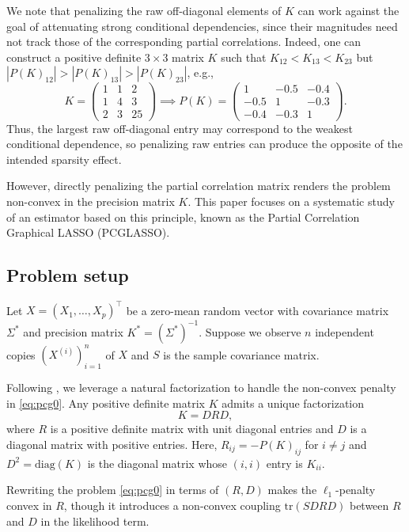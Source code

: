 \documentclass[12pt]{amsart}
\numberwithin{equation}{section}
\numberwithin{equation}{section}
\theoremstyle{plain}
\theoremstyle{definition}
\newcommand{\tr}{\mathrm{tr}}
\newcommand{\diag}[1]{\mathrm{diag}(#1)}
\begin{document}
We note that penalizing the raw off-diagonal elements of $K$ can work against the goal of attenuating strong conditional dependencies, since their magnitudes need not track those of the corresponding partial correlations. Indeed, one can construct a positive definite $3\times 3$ matrix $K$ such that $K_{12} < K_{13} < K_{23}$ but $|P(K)_{12}|>|P(K)_{13}|>|P(K)_{23}|$,
 e.g.,
 \[
K = \begin{pmatrix}
    1 & 1 & 2 \\ 
    1 & 4 & 3 \\
    2 & 3 & 25
\end{pmatrix}\implies
P(K) =  \begin{pmatrix}
    1 & -0.5 & -0.4 \\ 
    -0.5 & 1 & -0.3 \\
    -0.4 & -0.3 & 1
\end{pmatrix}.
\]
Thus, the largest raw off-diagonal entry may correspond to the weakest conditional dependence, so penalizing raw entries can produce the opposite of the intended sparsity effect.

However, directly penalizing the partial correlation matrix renders the problem non-convex in the precision matrix $K$. This paper focuses on a systematic study of an estimator based on this principle, known as the Partial Correlation Graphical LASSO (PCGLASSO).

\subsection{Problem setup}

Let $X=(X_1,\ldots,X_p)^\top$ be a zero-mean random vector with covariance matrix $\Sigma^\ast$ and precision matrix $K^\ast=(\Sigma^\ast)^{-1}$. Suppose we observe $n$ independent copies $(X^{(i)})_{i=1}^n$ of $X$ and $S$ is the sample covariance matrix.

Following \cite{Carter}, we leverage a natural factorization to handle the non-convex penalty in \eqref{eq:pcg0}. Any positive definite matrix $K$ admits a unique factorization
\[
K=DRD,
\]
where $R$ is a positive definite matrix with unit diagonal entries and $D$ is a diagonal matrix with positive entries. Here, $R_{ij} = - P(K)_{ij}$ for $i\neq j$ and $D^2 = \diag{K}$ is the diagonal matrix whose $(i,i)$ entry is $K_{ii}$. 

Rewriting the problem \eqref{eq:pcg0} in terms of $(R,D)$  makes the $\ell_1$-penalty convex in $R$, though it introduces a non-convex coupling $\tr(S D R D)$ between $R$ and $D$ in the likelihood term.
\end{document}
